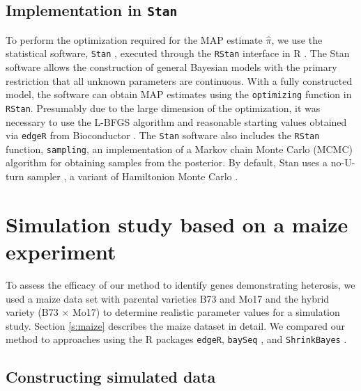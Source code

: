 \documentclass[useAMS,usenatbib,referee]{biom}
\newcommand{\RStan}{{\tt RStan}}
\newcommand{\edgeR}{{\tt edgeR}}
\newcommand{\baySeq}{{\tt baySeq}}
\newcommand{\ShrinkBayes}{{\tt ShrinkBayes}}
\begin{document}
\subsection{Implementation in {\tt Stan}}

To perform the optimization required for the MAP estimate $\hat{\pi}$, we use the statistical software, {\tt Stan} \citep{stan-software:2014}, executed through the \RStan{} interface \citep{rstan-software:2014} in R \citep{R2014}. The Stan software allows the construction of general Bayesian models with the primary restriction that all unknown parameters are continuous. With a fully constructed model, the software can obtain MAP estimates \cite[Section 50.3,][]{stan-manual:2014} using the {\tt optimizing} function in \RStan{}. Presumably due to the large dimension of the optimization, it was necessary to use the L-BFGS algorithm \cite[Section 55,][]{stan-manual:2014} and reasonable starting values obtained via \edgeR{} \citep{robinson2010edgeR} from Bioconductor \citep{gentleman2004bioconductor}. The {\tt Stan} software also includes the \RStan{} function, {\tt sampling}, an implementation of a Markov chain Monte Carlo (MCMC) algorithm for obtaining samples from the posterior. By default, Stan uses a no-U-turn sampler \citep{hoffman2013no}, a variant of Hamiltonion Monte Carlo \citep{neal2011mcmc}.


\section{Simulation study based on a maize experiment}
\label{s:simulation}

% 

To assess the efficacy of our method to identify genes demonstrating heterosis, we used a maize data set with parental varieties B73 and Mo17 and the hybrid variety (B73 $\times$ Mo17) \citep{paschold2012complementation} to determine realistic parameter values for a simulation study. Section \ref{s:maize} describes the maize dataset in detail. We compared our method to approaches using the R packages \edgeR{}, \baySeq{} \citep{hardcastle2010bayseq, hardcastle2012baySeq}, and \ShrinkBayes{} \citep{van2014shrinkbayes}.

\subsection{Constructing simulated data}
\label{s:sim_data}
\end{document}
